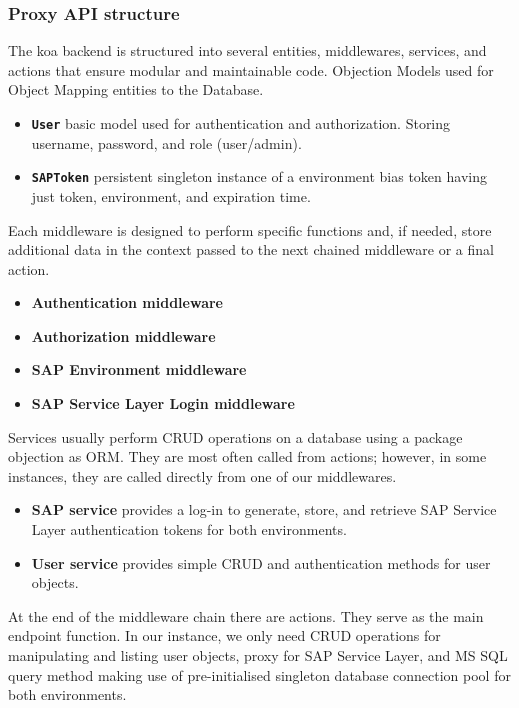 \subsubsection{Proxy API structure}
The \gls{koa} backend is structured into several entities, middlewares, services, and actions that ensure modular and maintainable code. 
Objection Models used for Object Mapping entities to the Database.
\begin{itemize}
    \item \textbf{\texttt{User}} basic model used for authentication and authorization. Storing username, password, and role (user/admin).
    \item \textbf{\texttt{SAPToken}} persistent singleton instance of a environment bias token having just token, environment, and expiration time.
\end{itemize}
Each middleware is designed to perform specific functions and, if needed, store additional data in the context passed to the next chained middleware or a final action.
\begin{itemize}
    \item \textbf{Authentication middleware}
    \item \textbf{Authorization middleware}
    \item \textbf{SAP Environment middleware}
    \item \textbf{SAP Service Layer Login middleware}
\end{itemize}
Services usually perform \ac{CRUD} operations on a database using a package \gls{objection} as \ac{ORM}. They are most often called from actions; however, in some instances, they are called directly from one of our middlewares.
\begin{itemize}
    \item \textbf{SAP service} provides a log-in to generate, store, and retrieve SAP Service Layer authentication tokens for both environments.
    \item \textbf{User service} provides simple CRUD and authentication methods for user objects.
\end{itemize}
At the end of the middleware chain there are actions.
They serve as the main endpoint function.
In our instance, we only need CRUD operations for manipulating and listing user objects, proxy for SAP Service Layer, and \ac{MS} SQL query method making use of pre-initialised singleton database connection pool for both environments.
